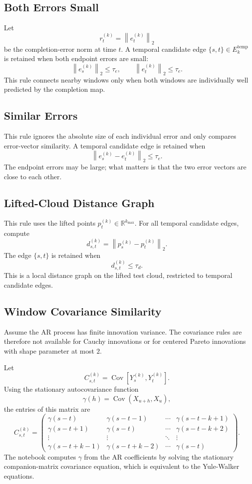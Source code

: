 \documentclass[11pt]{article}
\newcommand{\R}{\mathbb{R}}
\newcommand{\norm}[1]{\left\lVert #1 \right\rVert_2}
\begin{document}
\subsection{Both Errors Small}

Let
\[
  r_t^{(k)}=\norm{e_t^{(k)}}
\]
be the completion-error norm at time \(t\). A temporal candidate edge
\(\{s,t\}\in E_k^{\mathrm{temp}}\) is retained when both endpoint errors are
small:
\[
  \norm{e_s^{(k)}} \leq \tau_e,
  \qquad
  \norm{e_t^{(k)}} \leq \tau_e.
\]
This rule connects nearby windows only when both windows are individually well
predicted by the completion map.

\subsection{Similar Errors}

This rule ignores the absolute size of each individual error and only compares
error-vector similarity. A temporal candidate edge is retained when
\[
  \norm{e_s^{(k)}-e_t^{(k)}} \leq \tau_e.
\]
The endpoint errors may be large; what matters is that the two error vectors are
close to each other.

\subsection{Lifted-Cloud Distance Graph}

This rule uses the lifted points \(p_t^{(k)}\in\R^{k_{\max}}\). For all temporal
candidate edges, compute
\[
  d_{s,t}^{(k)}=\norm{p_s^{(k)}-p_t^{(k)}}.
\]
The edge \(\{s,t\}\) is retained when
\[
  d_{s,t}^{(k)} \leq \tau_d.
\]
This is a local distance graph on the lifted test cloud, restricted to temporal
candidate edges.

\subsection{Window Covariance Similarity}

Assume the AR process has finite innovation variance. The covariance rules are
therefore not available for Cauchy innovations or for centered Pareto
innovations with shape parameter at most \(2\).

Let
\[
  C_{s,t}^{(k)}
  =
  \operatorname{Cov}\!\left[Y_s^{(k)},Y_t^{(k)}\right].
\]
Using the stationary autocovariance function
\[
  \gamma(h)=\operatorname{Cov}(X_{u+h},X_u),
\]
the entries of this matrix are
\[
  C_{s,t}^{(k)}
  =
  \begin{pmatrix}
    \gamma(s-t) & \gamma(s-t-1) & \cdots & \gamma(s-t-k+1)\\
    \gamma(s-t+1) & \gamma(s-t) & \cdots & \gamma(s-t-k+2)\\
    \vdots & \vdots & \ddots & \vdots\\
    \gamma(s-t+k-1) & \gamma(s-t+k-2) & \cdots & \gamma(s-t)
  \end{pmatrix}.
\]
The notebook computes \(\gamma\) from the AR coefficients by solving the
stationary companion-matrix covariance equation, which is equivalent to the
Yule-Walker equations.
\end{document}
